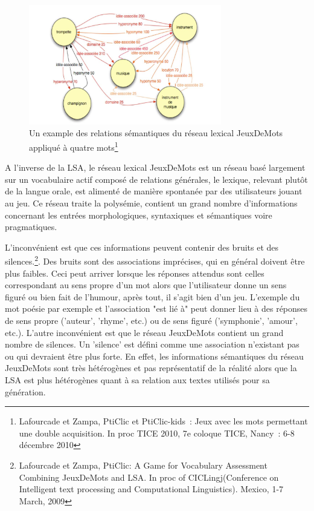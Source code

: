 \documentclass[a4paper,11pt,french]{article}
\begin{document}
\begin{figure}
 \begin{minipage}{\textwidth}
\centering 
       \includegraphics[width=0.75\textwidth]{img/jdm.jpeg}
    \caption[Caption for LOF]%
      {Un example des relations sémantiques du réseau lexical JeuxDeMots appliqué à quatre mots\footnote{Lafourcade et Zampa, PtiClic et PtiClic-kids~: Jeux avec les mots permettant une double acquisition. In proc TICE 2010, 7e coloque TICE, Nancy~: 6-8 décembre 2010}}
  \end{minipage}
\end{figure}

A l'inverse de la LSA, le réseau lexical JeuxDeMots est un réseau basé largement sur un vocabulaire actif composé de relations générales, le lexique, relevant plutôt de la langue orale, est alimenté de manière spontanée par des utilisateurs jouant au jeu. Ce réseau traite la polysémie, contient un grand nombre d'informations concernant les entrées morphologiques, syntaxiques et sémantiques voire pragmatiques. 

L'inconvénient est que ces informations peuvent contenir des bruits et des silences.\footnote{Lafourcade et Zampa, PtiClic: A Game for Vocabulary Assessment Combining JeuxDeMots and LSA. In proc of CICLingj(Conference on Intelligent text processing and Computational Linguistics). Mexico, 1-7 March, 2009}. Des bruits sont des associations imprécises, qui en général doivent être plus faibles. Ceci peut arriver lorsque les réponses attendus sont celles correspondant au sens propre d'un mot alors que l'utilisateur donne un sens figuré ou bien fait de l'humour, après tout, il s'agit bien d'un jeu. L'exemple du mot poésie par exemple et l'association "est lié à" peut donner lieu à des réponses de sens propre ('auteur', 'rhyme', etc.) ou de sens figuré ('symphonie', 'amour', etc.). L'autre inconvénient est que le réseau JeuxDeMots contient un grand nombre de silences. Un 'silence' est défini comme une association n'existant pas ou qui devraient être plus forte. En effet, les informations sémantiques du réseau JeuxDeMots sont très hétérogènes et pas représentatif de la réalité alors que la LSA est plus hétérogènes quant à sa relation aux textes utilisés pour sa génération. 
\end{document}
